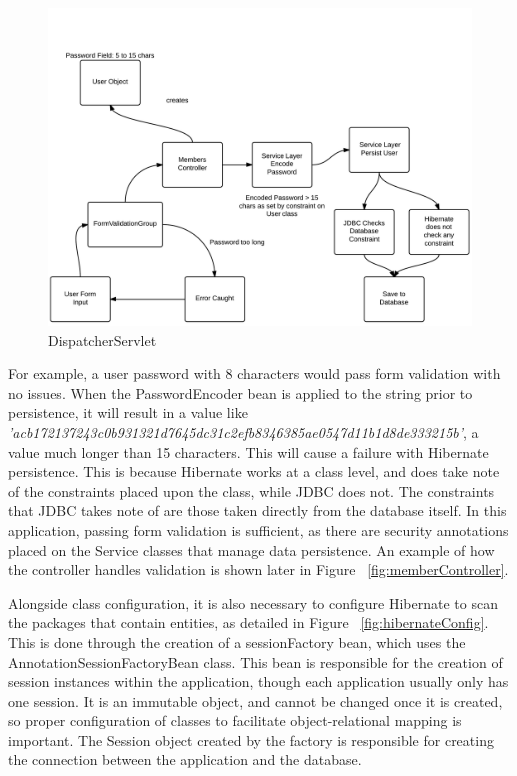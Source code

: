 \begin{figure}[H]
\begin{center}
\includegraphics[width=14cm]{dbflow.png}
\end{center}
\caption{DispatcherServlet }
\label{fig:dispatcherflow}
\end{figure}

For example, a user password with 8 characters would pass form validation with no issues. When the PasswordEncoder bean is applied to the string prior to persistence, it will result in a value like \textit{'acb172137243c0b931321d7645dc31c2efb8346385ae0547d11b1d8de333215b'}, a value much longer than 15 characters. This will cause a failure with Hibernate persistence. This is because Hibernate works at a class level, and does take note of the constraints placed upon the class, while JDBC does not. The constraints that JDBC takes note of are those taken directly from the database itself. In this application, passing form validation is sufficient, as there are security annotations placed on the Service classes that manage data persistence. An example of how the controller handles validation is shown later in Figure ~\ref{fig:memberController}. 

Alongside class configuration, it is also necessary to configure Hibernate to scan the packages that contain entities, as detailed in Figure ~\ref{fig:hibernateConfig}. This is done through the creation of a sessionFactory bean, which uses the AnnotationSessionFactoryBean class. This bean is responsible for the creation of session instances within the application, though each application usually only has one session. It is an immutable object, and cannot be changed once it is created, so proper configuration of classes to facilitate object-relational mapping is important. The Session object created by the factory is responsible for creating the connection between the application and the database.

